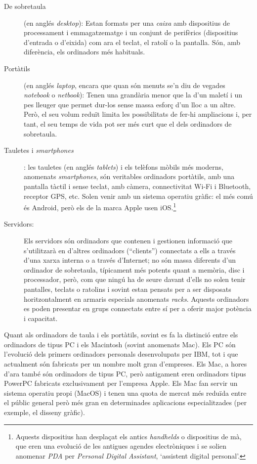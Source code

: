 \begin{description}
\item[De sobretaula] (en anglés \emph{desktop}): Estan formats per una
  \emph{caixa} amb dispositius de processament i emmagatzematge i un
  conjunt de perifèrics (dispositius d'entrada o d'eixida) com ara el
  teclat, el ratolí o la pantalla.  Són, amb diferència, els
  ordinadors més habituals.
\item[Portàtils] (en anglés \emph{laptop}, encara que quan són menuts
  se'n diu de vegades \emph{notebook} o \emph{netbook}): Tenen una
  grandària menor que la d'un maletí i un pes lleuger que permet
  dur-los sense massa esforç d'un lloc a un altre. Però, el seu volum
  reduït limita les possibilitats de fer-hi ampliacions i, per tant,
  el seu temps de vida pot ser més curt que el dels ordinadors de
  sobretaula. 
\item[Tauletes i \emph{smartphones}]: les tauletes (en anglés
  \emph{tablets}) i els telèfons mòbils més moderns, anomenats
  \emph{smartphones}, són veritables ordinadors por\-tà\-tils, amb una
  pantalla tàctil i sense teclat, amb càmera, connectivitat Wi-Fi i
  Bluetooth, receptor GPS, etc. Solen venir amb un sistema operatiu
  gràfic: el més comú és Android, però els de la marca Apple usen
  iOS.\footnote{Aquests dispositius han desplaçat els antics
    \emph{handhelds} o dispositius de mà, que eren una evolució de les
    antigues agendes electròniques i se solien anomenar \emph{PDA} per
    \emph{Personal Digital Assistant}, `assistent digital personal'.}

\item[Servidors:] Els servidors són ordinadors que contenen i
  gestionen informació que s'utilitzarà en d'altres ordinadors
  (``clients'') connectats a ells a través d'una xarxa interna o a
  través d'Internet; no són massa diferents d'un ordinador de
  sobretaula, típicament més potents quant a memòria, disc i
  processador, però, com que ningú ha de seure davant d'ells no solen
  tenir pantalles, teclats o ratolins i sovint estan pensats per a ser
  disposats horitzontalment en armaris especials anomenats
  \emph{racks}.  Aquests ordinadors es poden presentar en grups
  connectats entre sí per a oferir major potència i capacitat.
\end{description}

Quant als ordinadors de taula i els portàtils, sovint es fa la
distinció entre els ordinadors de tipus PC i els Macintosh (sovint
anomenats Mac). Els PC són l'evolució dels primers ordinadors
personals desenvolupats per IBM, tot i que actualment són fabricats
per un nombre molt gran d'empreses. Els Mac, a hores d'ara també són
ordinadors de tipus PC, però antigament eren ordinadors tipus PowerPC
fabricats exclusivament per l'empresa Apple. Els Mac fan servir un
sistema operatiu propi (MacOS) i tenen una quota de mercat més reduïda
entre el públic general però més gran en determinades aplicacions
especialitzades (per exemple, el disseny gràfic).

